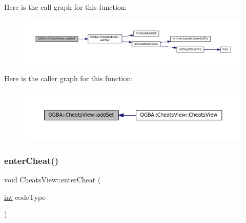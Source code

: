 Here is the call graph for this function\+:
\nopagebreak
\begin{figure}[H]
\begin{center}
\leavevmode
\includegraphics[width=350pt]{class_q_g_b_a_1_1_cheats_view_a37f11e62a7ad23c33635ad8c128db91d_cgraph}
\end{center}
\end{figure}
Here is the caller graph for this function\+:
\nopagebreak
\begin{figure}[H]
\begin{center}
\leavevmode
\includegraphics[width=350pt]{class_q_g_b_a_1_1_cheats_view_a37f11e62a7ad23c33635ad8c128db91d_icgraph}
\end{center}
\end{figure}
\mbox{\label{class_q_g_b_a_1_1_cheats_view_afac456331945de2dffbd8a51aa87f5c2}} 
\subsubsection{\texorpdfstring{enter\+Cheat()}{enterCheat()}}
{\footnotesize\ttfamily void Cheats\+View\+::enter\+Cheat (\begin{DoxyParamCaption}\item[{\mbox{\hyperlink{ioapi_8h_a787fa3cf048117ba7123753c1e74fcd6}{int}}}]{code\+Type }\end{DoxyParamCaption})\hspace{0.3cm}{\ttfamily [private]}}

